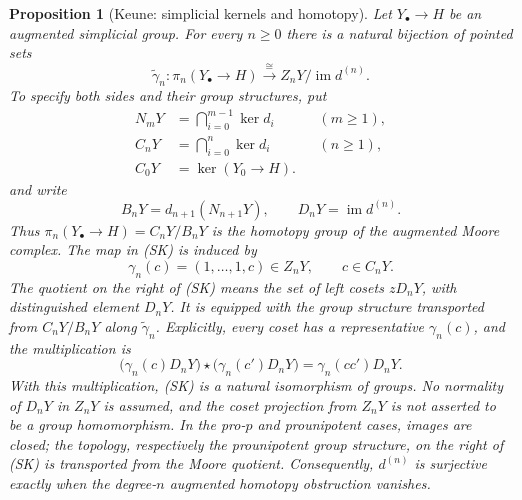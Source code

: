 \documentclass[10pt,a4paper]{amsart}
\newtheorem{proposition}[theorem]{Proposition}
\begin{document}
\begin{proposition}[Keune: simplicial kernels and homotopy]
\label{prop:keune-simplicial-kernel}
Let $Y_\bullet\to H$ be an augmented simplicial group. For every
$n\geq0$ there is a natural bijection of pointed sets
\[
 \widetilde\gamma_n:
 \pi_n(Y_\bullet\to H)\xrightarrow{\ \cong\ }
 Z_nY/\operatorname{im}d^{(n)}.
 \tag{SK}
\]
To specify both sides and their group structures, put
\[
 \begin{aligned}
 N_mY&=\bigcap_{i=0}^{m-1}\ker d_i &&(m\geq1),\\
 C_nY&=\bigcap_{i=0}^{n}\ker d_i &&(n\geq1),\\
 C_0Y&=\ker(Y_0\to H).
 \end{aligned}
\]
and write
\[
 B_nY=d_{n+1}(N_{n+1}Y),\qquad
 D_nY=\operatorname{im}d^{(n)}.
\]
Thus $\pi_n(Y_\bullet\to H)=C_nY/B_nY$ is the homotopy group
of the augmented Moore complex. The map in \textup{(SK)} is induced by
\[
 \gamma_n(c)=(1,\ldots,1,c)\in Z_nY,\qquad c\in C_nY.
\]
The quotient on the right of \textup{(SK)} means the set of left cosets
$zD_nY$, with distinguished element $D_nY$. It is equipped with the
group structure transported from $C_nY/B_nY$ along
$\widetilde\gamma_n$. Explicitly, every coset has a representative
$\gamma_n(c)$, and the multiplication is
\[
 \bigl(\gamma_n(c)D_nY\bigr)\star
 \bigl(\gamma_n(c')D_nY\bigr)
 =\gamma_n(cc')D_nY.
\]
With this multiplication, \textup{(SK)} is a natural isomorphism of
groups. No normality of $D_nY$ in $Z_nY$ is assumed, and the coset
projection from $Z_nY$ is not asserted to be a group homomorphism.
In the pro-$p$ and prounipotent cases, images are closed; the topology,
respectively the prounipotent group structure, on the right of
\textup{(SK)} is transported from the Moore quotient.
Consequently, $d^{(n)}$ is surjective exactly when the degree-$n$
augmented homotopy obstruction vanishes.
\end{proposition}
\end{document}
